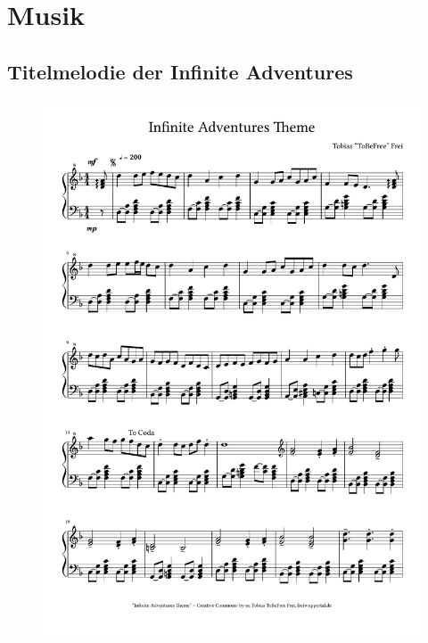 \part{Musik}

\chapter{Titelmelodie der Infinite Adventures}

% 
%
%

\begin{figure}[p]
	\includegraphics[width=\textwidth, page=1]{include-main-iatheme.pdf}
\end{figure}


